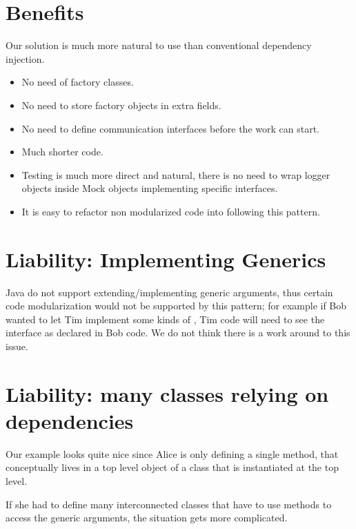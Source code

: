 \documentclass[submission,copyright,creativecommons]{eptcs}
\begin{document}
\section{Benefits}
Our solution is much more natural to use than conventional dependency injection.
\begin{itemize}
\item No need of factory classes.
\item No need to store factory objects in extra fields.
\item No need to define communication interfaces before the work can start.
\item Much shorter code.
\item Testing is much more direct and natural, there is no need
to wrap logger objects inside Mock objects implementing specific interfaces.
\item It is easy to refactor non modularized code into following this pattern.
\end{itemize}

\section{Liability: Implementing Generics}
Java do not support extending/implementing generic arguments, thus
certain code modularization would not be supported by this pattern;
for example if Bob wanted to let Tim implement some kinds of \Q@Item@s,
Tim code will need to see the \Q@Item@
 interface as declared in Bob code.
We do not think there is a work around to this issue.

\section{Liability: many classes relying on dependencies}
Our example looks quite nice since Alice is only defining a single
method, that conceptually lives in a top level object of a class that is
instantiated at the top level.

If she had to define many interconnected classes that have
to use \Q@Alice@ methods to access the generic arguments,
the situation gets more complicated.
\end{document}
